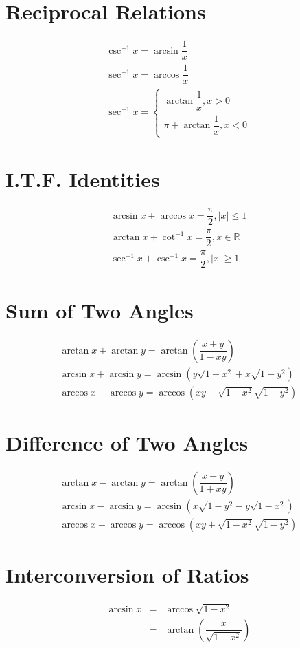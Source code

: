 \section{Reciprocal Relations}
\begin{align}
	\csc^{-1} x=\arcsin \dfrac{1}{x}\\
	\sec^{-1} x=\arccos \dfrac{1}{x}\\
	\sec^{-1} x=\begin{cases}
		\arctan \dfrac{1}{x}, x>0\\
		\pi+\arctan \dfrac{1}{x}, x<0
	\end{cases}
\end{align}


\section{I.T.F. Identities}
\begin{align}
	\arcsin x+\arccos x=\dfrac{\pi}{2}, \lvert x \rvert \leq 1\\
	\arctan x+\cot^{-1} x=\dfrac{\pi}{2}, x\in\mathbb{R}\\
	\sec^{-1} x+\csc^{-1} x=\dfrac{\pi}{2}, \lvert x \rvert \geq 1
\end{align}


\section{Sum of Two Angles}
\begin{align}
	\arctan x+\arctan y=\arctan \left(\dfrac{x+y}{1-xy}\right)\\
	\arcsin x+\arcsin y=\arcsin (y\sqrt{1-x^2}+x\sqrt{1-y^2})\\
	\arccos x+\arccos y=\arccos (xy-\sqrt{1-x^2}\sqrt{1-y^2})
\end{align}


\section{Difference of Two Angles}
\begin{align}
	\arctan x-\arctan y=\arctan \left(\dfrac{x-y}{1+xy}\right)\\
	\arcsin x-\arcsin y=\arcsin (x\sqrt{1-y^2}-y\sqrt{1-x^2})\\
	\arccos x-\arccos y=\arccos (xy+\sqrt{1-x^2}\sqrt{1-y^2})
\end{align}


\section{Interconversion of Ratios}
\begin{equation}
	\begin{aligned}
			\arcsin x & = & \arccos \sqrt{1-x^2}\\
			& = & \arctan \left(\dfrac{x}{\sqrt{1-x^2}}\right)
	\end{aligned}
\end{equation}

